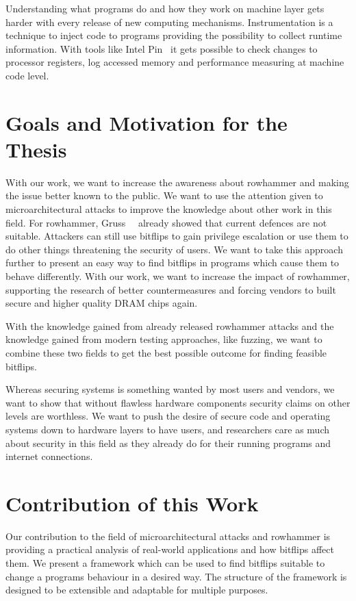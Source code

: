 Understanding what programs do and how they work on machine layer gets harder
with every release of new computing mechanisms. Instrumentation is a technique
to inject code to programs providing the possibility to collect runtime
information. With tools like Intel Pin~\cite{pintool} it gets possible to check
changes to processor registers, log accessed memory and performance measuring at
machine code level.

\section{Goals and Motivation for the Thesis}

With our work, we want to increase the awareness about rowhammer and making the
issue better known to the public. We want to use the attention given to
microarchitectural attacks to improve the knowledge about other work in this
field. For rowhammer, Gruss~\etal~\cite{flipinthewall} already showed that
current defences are not suitable. Attackers can still use bitflips to gain
privilege escalation or use them to do other things threatening the security of
users. We want to take this approach further to present an easy way to find
bitflips in programs which cause them to behave differently. With our work, we
want to increase the impact of rowhammer, supporting the research of better
countermeasures and forcing vendors to built secure and higher quality DRAM
chips again.

With the knowledge gained from already released rowhammer attacks and the
knowledge gained from modern testing approaches, like fuzzing, we want to
combine these two fields to get the best possible outcome for finding feasible
bitflips.

Whereas securing systems is something wanted by most users and vendors, we want
to show that without flawless hardware components security claims on other
levels are worthless. We want to push the desire of secure code and operating
systems down to hardware layers to have users, and researchers care as much
about security in this field as they already do for their running programs and
internet connections.

\section{Contribution of this Work}

Our contribution to the field of microarchitectural attacks and rowhammer is
providing a practical analysis of real-world applications and how bitflips
affect them. We present a framework which can be used to find bitflips suitable
to change a program\textquotesingle s behaviour in a desired way. The structure
of the framework is designed to be extensible and adaptable for multiple
purposes.

